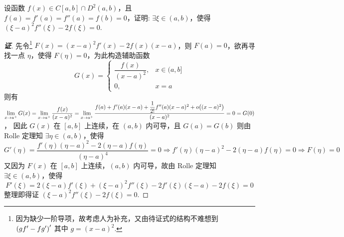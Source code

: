 \begin{example}
    设函数 $f(x)\in C[a,b]\cap D^2(a,b)$，且 $f(a)=f'(a)=f''(a)=f(b)=0$，证明: $\exists \xi\in(a,b)$，使得 $(\xi-a)^2f''(\xi)-2f(\xi)=0.$
\end{example}
\begin{proof}[{\songti \textbf{证}}]
    先令\footnote{因为缺少一阶导项，故考虑人为补充，又由待证式的结构不难想到 $\qty(gf'-fg')'$ 其中 $g=(x-a)^2$.} $F(x)=(x-a)^2f'(x)-2f(x)(x-a)$，则 $F(a)=0$，欲再寻找一点 $\eta$，使得 $F(\eta)=0$，为此构造辅助函数
    $$G(x)=\begin{cases}
            \dfrac{f(x)}{(x-a)^2}, & x\in(a,b] \\
            0,                     & x=a
        \end{cases}$$
    则有 $\displaystyle\lim_{x\to a^+}G(x)=\lim_{x\to a^+}\dfrac{f(x)}{(x-a)^2} =\lim_{x\to a^+}\dfrac{f(a)+f'(a)(x-a)+\dfrac{1}{2!}f''(a)(x-a)^2+o\qty((x-a)^2)}{(x-a)^2}=0=G(0)$，
    因此 $G(x)$ 在 $[a,b]$ 上连续，在 $(a,b)$ 内可导，且 $G(a)=G(b)$ 则由 Rolle 定理知
    $\exists\eta\in(a,b)$，使得 $$G'(\eta)=\dfrac{f'(\eta)(\eta-a)^2-2(\eta-a)f(\eta)}{(\eta-a)^4}=0\Rightarrow f'(\eta)(\eta-a)^2-2(\eta-a)f(\eta)=0\Rightarrow F(\eta)=0$$
    又因为 $F(x)$ 在 $[a,b]$ 上连续，$(a,b)$ 内可导，故由 Rolle 定理知 $\exists\xi\in(a,b)$，使得 $$F'(\xi)=2(\xi-a)f'(\xi)+(\xi-a)^2f''(\xi)-2f'(\xi)(\xi-a)-2f(\xi)=0$$
    整理即得证 $(\xi-a)^2f''(\xi)-2f(\xi)=0.$
\end{proof}
